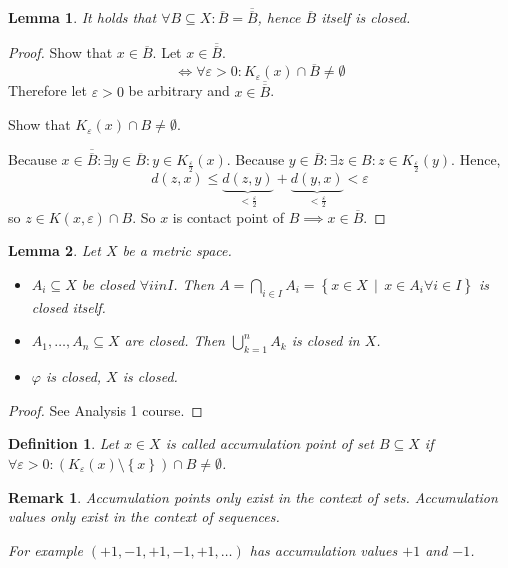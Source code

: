 \documentclass{article}
\newtheorem{definition}{Definition}  \numberwithin{definition}{section}
\newtheorem{lemma}{Lemma}  \numberwithin{lemma}{section}
\newtheorem{remark}{Remark}  \numberwithin{remark}{section}
\newcommand{\set}[1]{\left\{#1\right\}}
\newcommand{\setdef}[2]{\left\{\left.#1\,\middle|\,#2\right.\right\}}
\begin{document}
\begin{lemma}
  It holds that $\forall B \subseteq X: \overline{B} = \overline{\overline{B}}$,
  hence $\overline{B}$ itself is closed.
\end{lemma}
\begin{proof}
  Show that $x \in \overline{B}$. Let $x \in \overline{\overline{B}}$.
  \[ \iff \forall \varepsilon > 0: K_{\varepsilon}(x) \cap \overline{B} \neq \emptyset \]
  Therefore let $\varepsilon > 0$ be arbitrary and $x \in \overline{\overline{B}}$.

  Show that $K_{\varepsilon}(x) \cap B \neq \emptyset$.

  Because $x \in \overline{\overline{B}}: \exists y \in \overline{B}: y \in K_{\frac\varepsilon2}(x)$.
  Because $y \in \overline{B}: \exists z \in B: z \in K_{\frac\varepsilon2}(y)$. Hence,
  \[ d(z,x) \leq \underbrace{d(z,y)}_{<\frac\varepsilon2} + \underbrace{d(y,x)}_{<\frac\varepsilon2} < \varepsilon \]
  so $z \in K(x,\varepsilon) \cap B$. So $x$ is contact point of $B \implies x \in \overline{B}$.
\end{proof}

\begin{lemma}
  \label{lemma4}
  Let $X$ be a metric space.
  \begin{itemize}
    \item
      $A_i \subseteq X$ be closed $\forall i in I$.
      Then $A = \bigcap_{i \in I} A_i = \setdef{x \in X}{x \in A_i \forall i \in I}$
      is closed itself.
    \item
      $A_1, \dots, A_n \subseteq X$ are closed. Then $\bigcup_{k=1}^n A_k$ is closed in $X$.
    \item
      $\varphi$ is closed, $X$ is closed.
  \end{itemize}
\end{lemma}

\begin{proof}
  See Analysis 1 course.
\end{proof}

\begin{definition} %
  Let $x \in X$ is called accumulation point of set $B \subseteq X$ if $\forall \varepsilon > 0: (K_{\varepsilon}(x) \setminus \set{x}) \cap B \neq \emptyset$.
\end{definition}

\begin{remark}
  Accumulation \emph{points} only exist in the context of \emph{sets}.
  Accumulation \emph{values} only exist in the context of \emph{sequences}.

  For example $(+1, -1, +1, -1, +1, \dots)$ has accumulation \emph{values} $+1$ and $-1$.
\end{remark}
\end{document}
